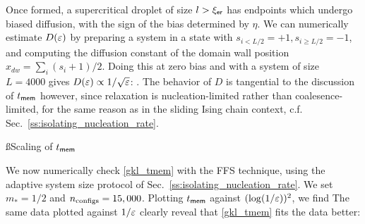 \documentclass[12pt]{article}
\newcommand{\ler}{\ell_{\sf er}}
\newcommand{\tmem}{t_{\sf mem}}
\renewcommand{\ler}{{\xi_{\sf er}}}
\begin{document}
Once formed, a supercritical droplet of size $l > \ler$ has endpoints which undergo biased diffusion, with the sign of the bias determined by $\eta$. We can numerically estimate $D(\varepsilon)$ by preparing a system in a state with $s_{i<L/2} = +1, s_{i\geq L/2} = -1$, and computing the diffusion constant of the domain wall position $x_{dw} = \sum_i (s_i + 1)/2$. Doing this at zero bias and with a system of size $L=4000$ gives $D(\varepsilon) \propto 1/\sqrt{\varepsilon}$:  
\be {}.\ee 
The behavior of $D$ is tangential to the discussion of $\tmem$ however, since relaxation is nucleation-limited rather than coalesence-limited, for the same reason as in the sliding Ising chain context, c.f. Sec.~\ref{ss:isolating_nucleation_rate}. 

\ss{Scaling of $\tmem$} 

We now numerically check \eqref{gkl_tmem} with the FFS technique, using the adaptive system size protocol of Sec.~\ref{ss:isolating_nucleation_rate}. We set $m_*=1/2$ and $n_{\rm configs} = 15,000$. 
Plotting $\tmem$ against $(\log(1/\varepsilon))^2$, we find 
\be {} \ee 
The same data plotted against $1/\varepsilon$ clearly reveal that \eqref{gkl_tmem} fits the data better: 
\be {} \ee 


\end{document}
